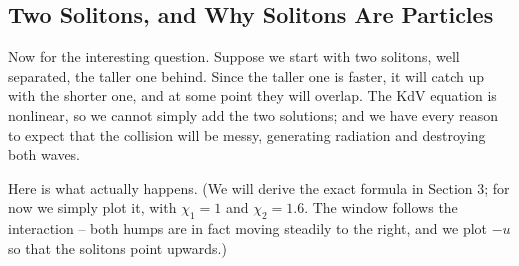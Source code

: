 \documentclass[a4paper]{scrartcl}
\begin{document}
\subsection{Two Solitons, and Why Solitons Are Particles}

Now for the interesting question. Suppose we start with two solitons, well separated, the taller one behind. Since the taller one is faster, it will catch up with the shorter one, and at some point they will overlap. The KdV equation is nonlinear, so we cannot simply add the two solutions; and we have every reason to expect that the collision will be messy, generating radiation and destroying both waves.

Here is what actually happens. (We will derive the exact formula in Section 3; for now we simply plot it, with $\chi_1 = 1$ and $\chi_2 = 1.6$. The window follows the interaction -- both humps are in fact moving steadily to the right, and we plot $-u$ so that the solitons point upwards.)
\end{document}
